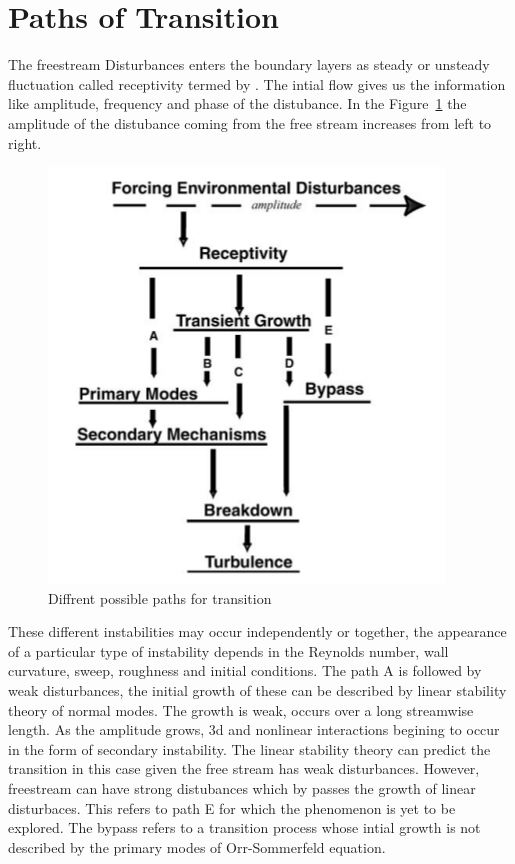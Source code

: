 \documentclass[twoside]{iitbreport}
\newcommand{\Figref}[1]{Figure~\ref{fig:#1}}
\begin{document}
\section{Paths of Transition}
The freestream Disturbances enters the boundary layers as steady or
unsteady fluctuation called receptivity termed by
\citet{Morkovin1969}. The intial flow gives us the
information like amplitude, frequency and phase of the distubance. In the
\Figref{path} the amplitude of the distubance coming from the free
stream increases from left to right. 
\begin{figure}[h!]
  \centering
  \includegraphics[scale=0.5]{path.png}
  \caption{Diffrent possible paths for transition }
  \label{fig:path}
\end{figure}

These different instabilities may occur independently or together, the
appearance of a particular type of instability depends in the Reynolds
number, wall curvature, sweep, roughness and initial conditions. The path A
is followed by weak disturbances, the initial growth of these can be
described by linear stability theory of normal modes. The growth is weak,
occurs over a long streamwise length. As the amplitude grows, 3d and
nonlinear interactions begining to occur in the form of secondary
instability. The linear stability theory can predict the transition in this
case given the free stream has weak disturbances. However, freestream can
have strong distubances which by passes the growth of linear disturbaces.
This refers to path E for which the phenomenon is yet to be explored. The
bypass refers to a transition process whose intial growth is not described
by the primary modes of Orr-Sommerfeld equation.
\end{document}
